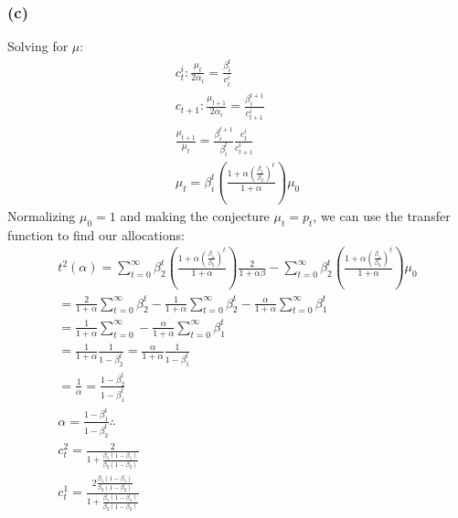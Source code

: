 \documentclass[10pt, a4paper]{article}
\begin{document}
    \subsubsection*{(c)}
      Solving for $\mu$:
      \begin{gather*}
        c_t^i: \frac{\mu_t}{2\alpha_i} = \frac{\beta_i^t}{c_t^i} \\
        c_{t+1}: \frac{\mu_{t+1}}{2\alpha_i} = \frac{\beta_i^{t+1}}{c_{t+1}^i} \\
        \frac{\mu_{t+1}}{\mu_t} = \frac{\beta_i^{t+1}}{\beta_i^{t}}\frac{c_t^i}{c_{t+1}^i} \\
        \mu_{t} = \beta_i^t(\frac{1+\alpha(\frac{\beta_1}{\beta_2})^t}{1+\alpha})\mu_0
      \end{gather*}
      Normalizing $\mu_0 = 1$ and making the conjecture $\mu_t = p_t$, we can use the transfer function to find our allocations:
      \begin{gather*}
        t^2(\alpha) = \sum\limits_{t=0}^{\infty}\beta_2^t(\frac{1+\alpha(\frac{\beta_1}{\beta_2})^t}{1+\alpha})\frac{2}{1+\alpha\beta} - \sum\limits_{t=0}^{\infty}\beta_2^t(\frac{1+\alpha(\frac{\beta_1}{\beta_2})^t}{1+\alpha})\mu_0 \\
        = \frac{2}{1+\alpha}\sum\limits_{t=0}^{\infty}\beta_2^t - \frac{1}{1+\alpha}\sum\limits_{t=0}^{\infty}\beta_2^t - \frac{\alpha}{1+\alpha}\sum\limits_{t=0}^{\infty}\beta_1^t \\
        = \frac{1}{1+\alpha}\sum\limits_{t=0}^{\infty} -\frac{\alpha}{1+\alpha}\sum\limits_{t=0}^{\infty}\beta_1^t \\
        =\frac{1}{1+\alpha}\frac{1}{1-\beta_2^t} = \frac{\alpha}{1+\alpha}\frac{1}{1-\beta_1^t} \\
        = \frac{1}{\alpha} = \frac{1-\beta_2^t}{1-\beta_1^t} \\
        \boxed{\alpha = \frac{1-\beta_1^t}{1-\beta_2^t}}
        \therefore \\
        \boxed{c_t^2 = \frac{2}{1+\frac{\beta_1(1-\beta_1)}{\beta_2(1-\beta_2)}}} \\
        \boxed{c_t^1 = \frac{2\frac{\beta_1(1-\beta_1)}{\beta_2(1-\beta_2)}}{1+\frac{\beta_1(1-\beta_1)}{\beta_2(1-\beta_2)}}} \\
      \end{gather*}
\end{document}
